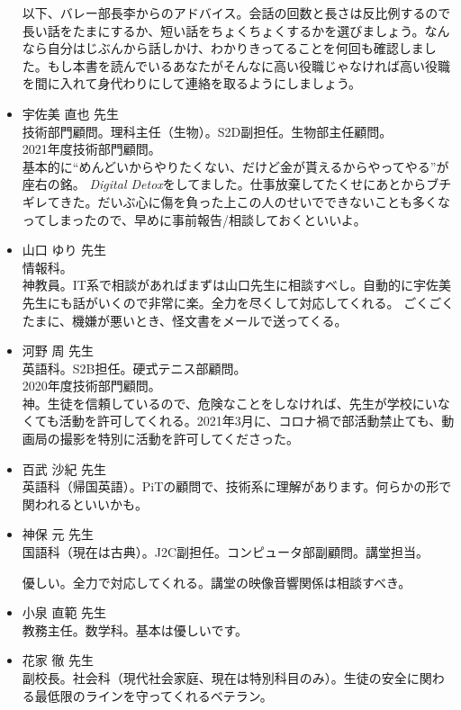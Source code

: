 \documentclass[dvipdfmx,jb5]{jarticle}
\begin{document}
\begin{itemize}
  以下、バレー部長李からのアドバイス。会話の回数と長さは反比例するので長い話をたまにするか、短い話をちょくちょくするかを選びましょう。なんなら自分はじぶんから話しかけ、わかりきってることを何回も確認しました。もし本書を読んでいるあなたがそんなに高い役職じゃなければ高い役職を間に入れて身代わりにして連絡を取るようにしましょう。

  \item 宇佐美 直也 先生\\
  技術部門顧問。理科主任（生物）。S2D副担任。生物部主任顧問。\\
  2021年度技術部門顧問。\\
  基本的に``めんどいからやりたくない、だけど金が貰えるからやってやる''が座右の銘。
  \textit{Digital Detox}をしてました。仕事放棄してたくせにあとからブチギレてきた。だいぶ心に傷を負った上この人のせいでできないことも多くなってしまったので、早めに事前報告/相談しておくといいよ。

  \item 山口 ゆり 先生\\
   情報科。\\
   神教員。IT系で相談があればまずは山口先生に相談すべし。自動的に宇佐美先生にも話がいくので非常に楽。全力を尽くして対応してくれる。
   ごくごくたまに、機嫌が悪いとき、怪文書をメールで送ってくる。

  \item 河野 周 先生\\
  英語科。S2B担任。硬式テニス部顧問。\\
  2020年度技術部門顧問。\\
  神。生徒を信頼しているので、危険なことをしなければ、先生が学校にいなくても活動を許可してくれる。2021年3月に、コロナ禍で部活動禁止ても、動画局の撮影を特別に活動を許可してくださった。

  \item 百武 沙紀 先生\\
  英語科（帰国英語）。PiTの顧問で、技術系に理解があります。何らかの形で関われるといいかも。

  \item 神保 元 先生\\
  国語科（現在は古典）。J2C副担任。コンピュータ部副顧問。講堂担当。

  優しい。全力で対応してくれる。講堂の映像音響関係は相談すべき。

  \item 小泉 直範 先生\\
  教務主任。数学科。基本は優しいです。

  \item 花家 徹 先生\\
  副校長。社会科（現代社会家庭、現在は特別科目のみ）。生徒の安全に関わる最低限のラインを守ってくれるベテラン。


\end{itemize}
\end{document}

